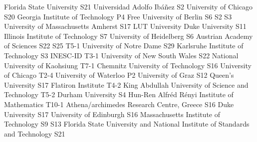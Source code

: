 \begin{multicols}{2}
{}
{Florida State University}
{S21}
{}
{}
{}
{}
{}
{}
{Universidad Adolfo Ibáñez}
{S2}
{}
{}
{}
{}
{}
{}
{University of Chicago}
{S20}
{}
{}
{}
{}
{}
{}
{Georgia Institute of Technology}
{P4}
{}
{}
{}
{}
{}
{}
{Free University of Berlin}
{S6}
{S2}
{S3}
{}
{}
{}
{}
{University of Massachusetts Amherst}
{S17}
{}
{}
{}
{}
{}
{}
{LUT University}
{}
{}
{}
{}
{}
{}
{}
{Duke University}
{S11}
{}
{}
{}
{}
{}
{}
{Illinois Institute of Technology}
{S7}
{}
{}
{}
{}
{}
{}
{University of Heidelberg}
{S6}
{}
{}
{}
{}
{}
{}
{Austrian Academy of Sciences}
{S22}
{S25}
{T5-1}
{}
{}
{}
{}
{University of Notre Dame}
{S29}
{}
{}
{}
{}
{}
{}
{Karlsruhe Institute of Technology}
{S3}
{}
{}
{}
{}
{}
{}
{INESC-ID}
{T3-1}
{}
{}
{}
{}
{}
{}
{University of New South Wales}
{S22}
{}
{}
{}
{}
{}
{}
{National University of Kaohsiung}
{T7-1}
{}
{}
{}
{}
{}
{}
{Chemnitz University of Technology}
{S16}
{}
{}
{}
{}
{}
{}
{University of Chicago}
{T2-4}
{}
{}
{}
{}
{}
{}
{University of Waterloo}
{P2}
{}
{}
{}
{}
{}
{}
{University of Graz}
{S12}
{}
{}
{}
{}
{}
{}
{Queen's University}
{S17}
{}
{}
{}
{}
{}
{}
{Flatiron Institute}
{T4-2}
{}
{}
{}
{}
{}
{}
{King Abdullah University of Science and Technology}
{T5-2}
{}
{}
{}
{}
{}
{}
{Durham University}
{S4}
{}
{}
{}
{}
{}
{}
{Hun-Ren Alfréd Rényi Institute of Mathematics}
{T10-1}
{}
{}
{}
{}
{}
{}
{Athena/archimedes Research Centre, Greece}
{S16}
{}
{}
{}
{}
{}
{}
{Duke University}
{S17}
{}
{}
{}
{}
{}
{}
{University of Edinburgh}
{S16}
{}
{}
{}
{}
{}
{}
{Massachusetts Institute of Technology}
{S9}
{S13}
{}
{}
{}
{}
{}
{Florida State University and National Institute of Standards and Technology}
{S21}
{}
{}
{}
{}
{}
{}

\end{multicols}
